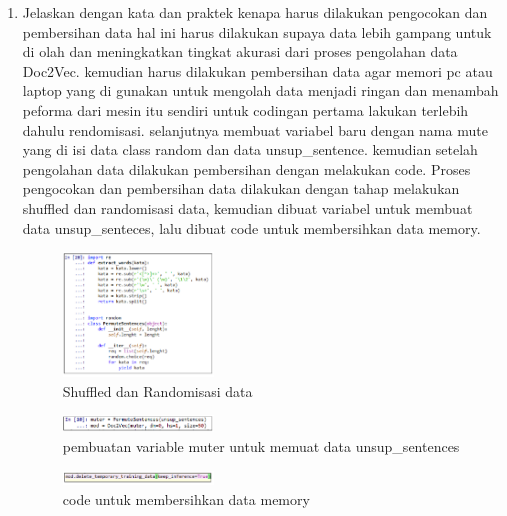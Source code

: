 \begin{enumerate}
    \item Jelaskan dengan kata dan praktek kenapa harus dilakukan pengocokan dan pembersihan data
    hal ini harus dilakukan supaya data lebih gampang untuk di olah dan meningkatkan tingkat akurasi dari proses pengolahan data Doc2Vec. kemudian harus dilakukan pembersihan data agar memori pc atau laptop yang di gunakan untuk mengolah data menjadi ringan dan menambah peforma dari mesin itu sendiri untuk codingan pertama lakukan terlebih dahulu rendomisasi. selanjutnya membuat variabel baru dengan nama mute yang di isi data class random dan data unsup\_sentence. kemudian setelah pengolahan data dilakukan pembersihan dengan melakukan code. 
    \hfill\break
    Proses pengocokan dan pembersihan data dilakukan dengan tahap melakukan shuffled dan randomisasi data, kemudian dibuat variabel untuk membuat data unsup\_senteces, lalu dibuat code untuk membersihkan data memory.
    \begin{figure}[H]
        \includegraphics[width=4cm]{figures/1174096/tugas5/praktek5_1.PNG}
        \centering
        \caption{Shuffled dan Randomisasi data }
    \end{figure}
    \begin{figure}[H]
        \includegraphics[width=4cm]{figures/1174096/tugas5/praktek5_2.PNG}
        \centering
        \caption{pembuatan variable muter untuk memuat data unsup\_sentences}
    \end{figure}
    \begin{figure}[H]
        \includegraphics[width=4cm]{figures/1174096/tugas5/praktek5_3.PNG}
        \centering
        \caption{code untuk membersihkan data memory}
    \end{figure}


\end{enumerate}

